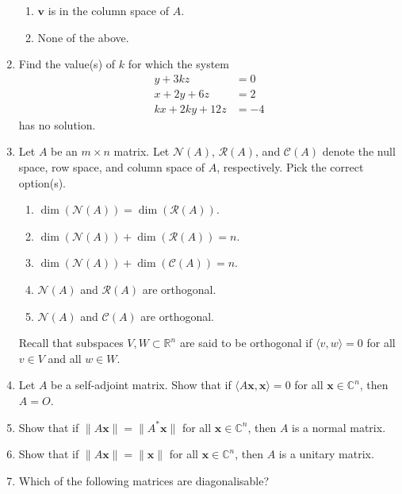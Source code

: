 \documentclass[12pt]{article}
\begin{document}
\begin{enumerate}[leftmargin=*]
\begin{enumerate}
	 	\item $\mathbf{v}$ is in the column space of $A$.
	 	\item None of the above.
	 \end{enumerate}
	 \item Find the value(s) of $k$ for which the system
	 \begin{align*} 
	 	y + 3kz &= 0 \\
	 	x + 2y + 6z &= 2 \\
	 	kx + 2ky + 12z &= -4
	 \end{align*}
	 has no solution.
	 \item Let $A$ be an $m \times n$ matrix. Let $\mathcal{N}(A)$, $\mathcal{R}(A)$, and $\mathcal{C}(A)$ denote the null space, row space, and column space of $A$, respectively. Pick the correct option(s).
	 \begin{enumerate}
	 	\item $\dim(\mathcal{N}(A)) = \dim(\mathcal{R}(A))$.
	 	\item $\dim(\mathcal{N}(A)) + \dim(\mathcal{R}(A)) = n$.
	 	\item $\dim(\mathcal{N}(A)) + \dim(\mathcal{C}(A)) = n$.
	 	\item $\mathcal{N}(A)$ and $\mathcal{R}(A)$ are orthogonal.
	 	\item $\mathcal{N}(A)$ and $\mathcal{C}(A)$ are orthogonal.
	 \end{enumerate}
	 Recall that subspaces $V, W \subset \mathbb{R}^{n}$ are said to be orthogonal if $\langle v, w \rangle = 0$ for all $v \in V$ and all $w \in W$.
	 \item Let $A$ be a self-adjoint matrix. Show that if $\langle A \mathbf{x}, \mathbf{x}\rangle = 0$ for all $\mathbf{x} \in \mathbb{C}^{n}$, then $A = O$.
	 \item Show that if $\|A \mathbf{x}\| = \|A^{\ast} \mathbf{x}\|$ for all $\mathbf{x} \in \mathbb{C}^{n}$, then $A$ is a normal matrix.
	 \item Show that if $\|A \mathbf{x}\| = \|\mathbf{x}\|$ for all $\mathbf{x} \in \mathbb{C}^{n}$, then $A$ is a unitary matrix.
	 \item Which of the following matrices are diagonalisable?


\end{enumerate}
\end{document}
